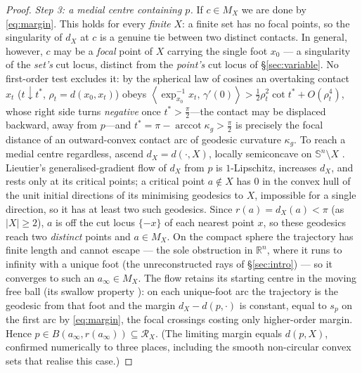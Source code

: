 \documentclass[11pt]{article}
\theoremstyle{remark}
\newcommand{\R}{\mathbb{R}}
\newcommand{\X}{X}
\newcommand{\Mx}{M_{\X}}
\newcommand{\Rx}{\mathcal{R}_{\X}}
\newcommand{\sca}[2]{\left\langle #1,\, #2\right\rangle}
\newcommand{\Sn}{\mathbb{S}^{n}}
\begin{document}
\begin{proof}
\emph{Step 3: a medial centre containing $p$.} If $c\in\Mx$ we are done by
\eqref{eq:margin}. This holds for every \emph{finite} $\X$: a finite set has
no focal points, so the singularity of $d_{\X}$ at $c$ is a genuine tie
between two distinct contacts. In general, however, $c$ may be a
\emph{focal} point of $\X$ carrying the single foot $x_{0}$ --- a
singularity of the \emph{set's} cut locus, distinct from the \emph{point's}
cut locus of \S\ref{sec:variable}. No first-order test excludes it: by the
spherical law of cosines an overtaking contact $x_{t}$ ($t\downarrow
t^{\ast}$, $\rho_{t}=d(x_{0},x_{t})$) obeys $\sca{\exp_{x_{0}}^{-1}
x_{t}}{\gamma'(0)}>\tfrac12\rho_{t}^{2}\cot t^{\ast}+O(\rho_{t}^{4})$, whose
right side turns \emph{negative} once $t^{\ast}>\tfrac\pi2$---the contact
may be displaced backward, away from $p$---and $t^{\ast}=\pi-
\operatorname{arccot}\kappa_{g}>\tfrac\pi2$ is precisely the focal distance
of an outward-convex contact arc of geodesic curvature $\kappa_{g}$. To
reach a medial centre regardless, ascend $d_{\X}=d(\cdot,\X)$, locally
semiconcave on $\Sn\setminus\X$ \cite{ACa}. Lieutier's generalised-gradient flow of
$d_{\X}$ from $p$ \cite{Lie} is $1$-Lipschitz, increases $d_{\X}$, and rests
only at its critical points; a critical point $a\notin\X$ has $0$ in the
convex hull of the unit initial directions of its minimising geodesics to
$\X$, impossible for a single direction, so it has at least two such
geodesics. Since $r(a)=d_{\X}(a)<\pi$ (as $|\X|\ge2$), $a$ is off the cut
locus $\{-x\}$ of each nearest point $x$, so these geodesics reach two
\emph{distinct} points and $a\in\Mx$. On the compact sphere the trajectory
has finite length and cannot escape --- the sole obstruction in $\R^{n}$,
where it runs to infinity with a unique foot (the unreconstructed rays of
\S\ref{sec:intro}) --- so it converges to such an $a_{\infty}\in\Mx$. The
flow retains its starting centre in the moving free ball (its swallow
property \cite{Lie}): on each unique-foot arc the trajectory is the geodesic
from that foot and the margin $d_{\X}-d(p,\cdot)$ is constant, equal to
$s_{p}$ on the first arc by \eqref{eq:margin}, the focal crossings costing
only higher-order margin. Hence $p\in B(a_{\infty},r(a_{\infty}))\subseteq
\Rx$. (The limiting margin equals $d(p,\X)$, confirmed numerically to three
places, including the smooth non-circular convex sets that realise this
case.)
\end{proof}
\end{document}
